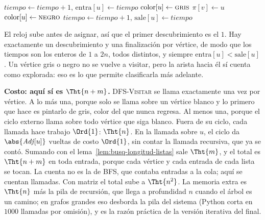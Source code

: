 \documentclass[11pt,letterpaper]{article}
\begin{document}
\begin{algorithm}[H]
\caption{\textsc{DFS-Visitar}$(G, u)$, la visita recursiva de
  \textsc{DFS}}
\label{alg:busq-dfs-visitar}
\begin{algorithmic}[1]
  \State $\mathit{tiempo} \gets \mathit{tiempo} + 1$, \quad
         $\text{entra}[u] \gets \mathit{tiempo}$
  \State $\text{color}[u] \gets \textsc{gris}$
   
      \State $\pi[v] \gets u$
      \State {}
    \EndIf
  \EndFor
  \State $\text{color}[u] \gets \textsc{negro}$ 
  \State $\mathit{tiempo} \gets \mathit{tiempo} + 1$, \quad
         $\text{sale}[u] \gets \mathit{tiempo}$
\EndProcedure
\end{algorithmic}
\end{algorithm}

El reloj sube antes de asignar, así que el primer descubrimiento es el
$1$. Hay exactamente un descubrimiento y una finalización por vértice,
de modo que los tiempos son los enteros de $1$ a $2n$, todos
distintos, y siempre $\text{entra}[u] < \text{sale}[u]$. Un vértice
gris o negro no se vuelve a visitar, pero la arista hacia él sí cuenta
como explorada: eso es lo que permite clasificarla más adelante.

\textbf{Costo: aquí sí es $\Tht{n + m}$.} \textsc{DFS-Visitar} se llama
exactamente una vez por vértice. A lo más una, porque solo se llama
sobre un vértice blanco y lo primero que hace es pintarlo de gris,
color del que nunca regresa. Al menos una, porque el ciclo externo
llama sobre todo vértice que siga blanco. Fuera de su ciclo, cada
llamada hace trabajo $\Ord{1}$: $\Tht{n}$. En la llamada sobre $u$, el
ciclo da $\abs{\mathit{Adj}[u]}$ vueltas de costo $\Ord{1}$, sin
contar la llamada recursiva, que ya se contó. Sumando con el
lema~\ref{lem:busq-longitud-listas} sale $\Tht{m}$, y el total es
$\Tht{n + m}$ en toda entrada, porque cada vértice y cada entrada de
cada lista se tocan. La cuenta no es la de BFS, que contaba entradas a
la cola; aquí se cuentan llamadas. Con matriz el total sube a
$\Tht{n^2}$. La memoria extra es $\Tht{n}$ más la pila de recursión,
que llega a profundidad $n$ cuando el árbol es un camino; en grafos
grandes eso desborda la pila del sistema (Python corta en $1000$
llamadas por omisión), y es la razón práctica de la versión
iterativa del final.
\end{document}

